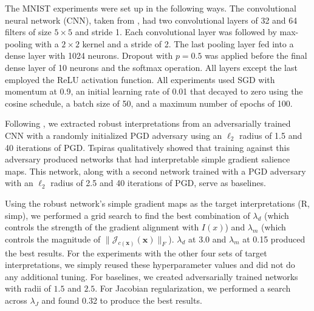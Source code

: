 The MNIST experiments were set up in the following ways. The convolutional neural network (CNN), taken from \cite{simple_cnn}, had two convolutional layers of 32 and 64 filters of size $5\times5$ and stride 1. Each convolutional layer was followed by max-pooling with a $2\times2$ kernel and a stride of 2. The last pooling layer fed into a dense layer with 1024 neurons. Dropout with $p=0.5$ was applied before the final dense layer of 10 neurons and the softmax operation. All layers except the last employed the ReLU activation function. All experiments used SGD with momentum at 0.9, an initial learning rate of 0.01 that decayed to zero using the cosine schedule, a batch size of 50, and a maximum number of epochs of 100.

Following \cite{robustness_vs_accuracy}, we extracted robust interpretations from an adversarially trained CNN with a randomly initialized PGD adversary using an $\ell_2$ radius of 1.5 and 40 iterations of PGD. Tspiras \etal \cite{robustness_vs_accuracy} qualitatively showed that training against this adversary produced networks that had interpretable simple gradient salience maps. This network, along with a second network trained with a PGD adversary with an $\ell_2$ radius of 2.5 and 40 iterations of PGD, serve as baselines.




Using the robust network's simple gradient maps as the target interpretations (R, simp), we performed a grid search to find the best combination of $\lambda_d$ (which controls the strength of the gradient alignment with $I(x)$) and $\lambda_m$ (which controls the magnitude of $\| \mathcal{J}_{c(\bm x)}(\bm x) \|_F$). $\lambda_d$ at 3.0 and $\lambda_m$ at 0.15 produced the best results. For the experiments with the other four sets of target interpretations, we simply reused these hyperparameter values and did not do any additional tuning. 
For baselines, we created adversarially trained networks with radii of $1.5$ and $2.5$. For Jacobian regularization, we performed a search across $\lambda_J$ and found 0.32 to produce the best results.

